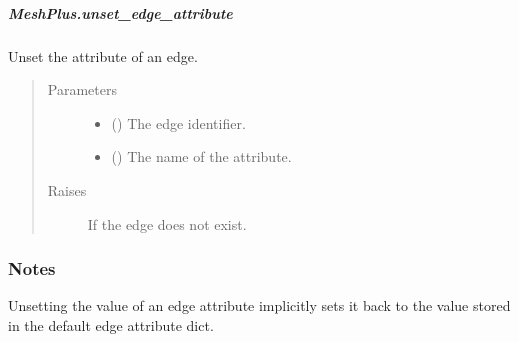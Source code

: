 \documentclass[letterpaper,10pt,english]{sphinxmanual}
\begin{document}
\begin{fulllineitems}
\begin{fulllineitems}
\begin{quote}
\begin{description}
\begin{itemize}
\end{itemize}

\end{description}\end{quote}

\end{fulllineitems}



\subparagraph{MeshPlus.unset\_edge\_attribute}
\label{\detokenize{api/generated/directional_clustering.mesh.MeshPlus.unset_edge_attribute:meshplus-unset-edge-attribute}}\label{\detokenize{api/generated/directional_clustering.mesh.MeshPlus.unset_edge_attribute::doc}}

\begin{fulllineitems}
\label{\detokenize{api/generated/directional_clustering.mesh.MeshPlus.unset_edge_attribute:directional_clustering.mesh.MeshPlus.unset_edge_attribute}}
Unset the attribute of an edge.
\begin{quote}\begin{description}
\item[{Parameters}] \leavevmode\begin{itemize}
\item {} 
 () \textendash{} The edge identifier.

\item {} 
 () \textendash{} The name of the attribute.

\end{itemize}

\item[{Raises}] \leavevmode
{} \textendash{} If the edge does not exist.

\end{description}\end{quote}
\subsubsection*{Notes}

Unsetting the value of an edge attribute implicitly sets it back to the value
stored in the default edge attribute dict.


\end{fulllineitems}
\end{fulllineitems}
\end{document}
